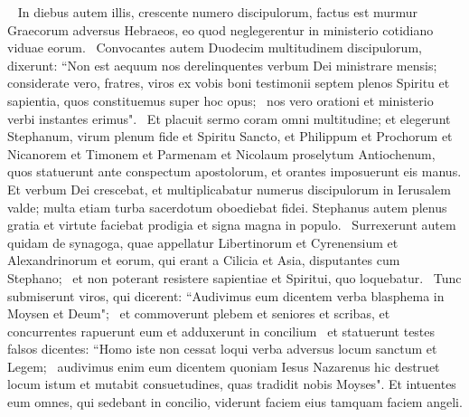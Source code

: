 \begin{biblechapter}   
\verse In diebus autem illis, crescente numero discipulorum, factus est murmur Graecorum adversus Hebraeos, eo quod neglegerentur in ministerio cotidiano viduae eorum.  
\verse Convocantes autem Duodecim multitudinem discipulorum, dixerunt: “Non est aequum nos derelinquentes verbum Dei ministrare mensis;  
\verse considerate vero, fratres, viros ex vobis boni testimonii septem plenos Spiritu et sapientia, quos constituemus super hoc opus;  
\verse nos vero orationi et ministerio verbi instantes erimus".  
\verse Et placuit sermo coram omni multitudine; et elegerunt Stephanum, virum plenum fide et Spiritu Sancto, et Philippum et Prochorum et Nicanorem et Timonem et Parmenam et Nicolaum proselytum Antiochenum,  
\verse quos statuerunt ante conspectum apostolorum, et orantes imposuerunt eis manus. 
\verse Et verbum Dei crescebat, et multiplicabatur numerus discipulorum in Ierusalem valde; multa etiam turba sacerdotum oboediebat fidei. 
\verse Stephanus autem plenus gratia et virtute faciebat prodigia et signa magna in populo.  
\verse Surrexerunt autem quidam de synagoga, quae appellatur Libertinorum et Cyrenensium et Alexandrinorum et eorum, qui erant a Cilicia et Asia, disputantes cum Stephano;  
\verse et non poterant resistere sapientiae et Spiritui, quo loquebatur.  
\verse Tunc submiserunt viros, qui dicerent: “Audivimus eum dicentem verba blasphema in Moysen et Deum";  
\verse et commoverunt plebem et seniores et scribas, et concurrentes rapuerunt eum et adduxerunt in concilium  
\verse et statuerunt testes falsos dicentes: “Homo iste non cessat loqui verba adversus locum sanctum et Legem;  
\verse audivimus enim eum dicentem quoniam Iesus Nazarenus hic destruet locum istum et mutabit consuetudines, quas tradidit nobis Moyses". 
\verse Et intuentes eum omnes, qui sedebant in concilio, viderunt faciem eius tamquam faciem angeli. 
\end{biblechapter}

